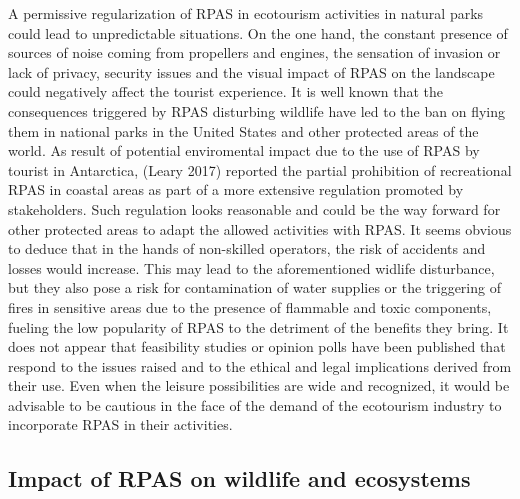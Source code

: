 \documentclass[]{interact}
\theoremstyle{plain}%
\theoremstyle{definition}
\theoremstyle{remark}
\begin{document}
A permissive regularization of RPAS in ecotourism activities in natural
parks could lead to unpredictable situations. On the one hand, the
constant presence of sources of noise coming from propellers and
engines, the sensation of invasion or lack of privacy, security issues
and the visual impact of RPAS on the landscape could negatively affect
the tourist experience. It is well known that the consequences triggered
by RPAS disturbing wildlife have led to the ban on flying them in
national parks in the United States and other protected areas of the
world. As result of potential enviromental impact due to the use of RPAS
by tourist in Antarctica, (Leary 2017) reported the partial prohibition
of recreational RPAS in coastal areas as part of a more extensive
regulation promoted by stakeholders. Such regulation looks reasonable
and could be the way forward for other protected areas to adapt the
allowed activities with RPAS. It seems obvious to deduce that in the
hands of non-skilled operators, the risk of accidents and losses would
increase. This may lead to the aforementioned widlife disturbance, but
they also pose a risk for contamination of water supplies or the
triggering of fires in sensitive areas due to the presence of flammable
and toxic components, fueling the low popularity of RPAS to the
detriment of the benefits they bring. It does not appear that
feasibility studies or opinion polls have been published that respond to
the issues raised and to the ethical and legal implications derived from
their use. Even when the leisure possibilities are wide and recognized,
it would be advisable to be cautious in the face of the demand of the
ecotourism industry to incorporate RPAS in their activities.

\subsection{Impact of RPAS on wildlife and
ecosystems}\label{impact-of-rpas-on-wildlife-and-ecosystems-1}
\end{document}
